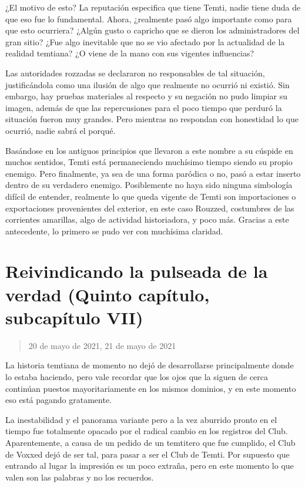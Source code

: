 \documentclass[
  spanish,
]{book}
\begin{document}
¿El motivo de esto? La reputación especifica que tiene Temti, nadie tiene duda de que eso fue lo fundamental. Ahora, ¿realmente pasó algo importante como para que esto ocurriera? ¿Algún gusto o capricho que se dieron los administradores del gran sitio? ¿Fue algo inevitable que no se vio afectado por la actualidad de la realidad temtiana? ¿O viene de la mano con sus vigentes influencias?

Las autoridades rozzadas se declararon no responsables de tal situación, justificándola como una ilusión de algo que realmente no ocurrió ni existió. Sin embargo, hay pruebas materiales al respecto y su negación no pudo limpiar su imagen, además de que las repercusiones para el poco tiempo que perduró la situación fueron muy grandes. Pero mientras no respondan con honestidad lo que ocurrió, nadie sabrá el porqué.

Basándose en los antiguos principios que llevaron a este nombre a su cúspide en muchos sentidos, Temti está permaneciendo muchísimo tiempo siendo su propio enemigo. Pero finalmente, ya sea de una forma paródica o no, pasó a estar inserto dentro de su verdadero enemigo. Posiblemente no haya sido ninguna simbología difícil de entender, realmente lo que queda vigente de Temti son importaciones o exportaciones provenientes del exterior, en este caso Rouzzed, costumbres de las corrientes amarillas, algo de actividad historiadora, y poco más. Gracias a este antecedente, lo primero se pudo ver con muchísima claridad.

\hypertarget{reivindicando-la-pulseada-de-la-verdad-quinto-capuxedtulo-subcapuxedtulo-vii}{%
\section{Reivindicando la pulseada de la verdad (Quinto capítulo, subcapítulo VII)}\label{reivindicando-la-pulseada-de-la-verdad-quinto-capuxedtulo-subcapuxedtulo-vii}}

\begin{quote}
20 de mayo de 2021, 21 de mayo de 2021
\end{quote}

La historia temtiana de momento no dejó de desarrollarse principalmente donde lo estaba haciendo, pero vale recordar que los ojos que la siguen de cerca continúan puestos mayoritariamente en los mismos dominios, y en este momento eso está pagando gratamente.

La inestabilidad y el panorama variante pero a la vez aburrido pronto en el tiempo fue totalmente opacado por el radical cambio en los registros del Club. Aparentemente, a causa de un pedido de un temtitero que fue cumplido, el Club de Voxxed dejó de ser tal, para pasar a ser el Club de Temti. Por supuesto que entrando al lugar la impresión es un poco extraña, pero en este momento lo que valen son las palabras y no los recuerdos.
\end{document}
